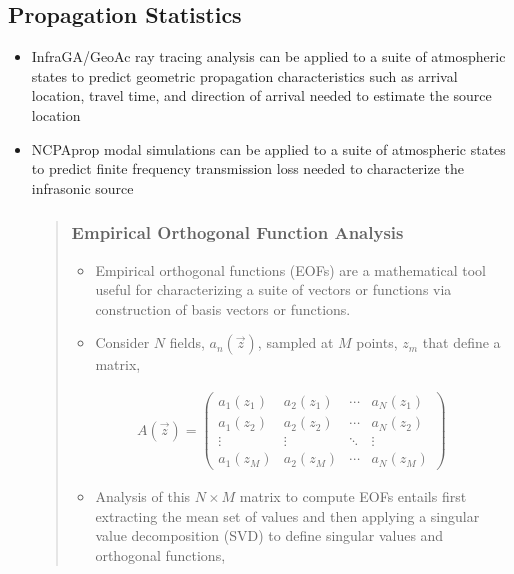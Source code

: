 \documentclass[letterpaper,10pt,english]{sphinxmanual}
\begin{document}
\subsection{Propagation Statistics}
\label{\detokenize{analysis:propagation}}\begin{itemize}
\item {} 
InfraGA/GeoAc ray tracing analysis can be applied to a suite of atmospheric states to predict geometric propagation characteristics such as arrival location, travel time, and direction of arrival needed to estimate the source location

\item {} 
NCPAprop modal simulations can be applied to a suite of atmospheric states to predict finite frequency transmission loss needed to characterize the infrasonic source
\begin{quote}


\subsubsection{Empirical Orthogonal Function Analysis}
\label{\detokenize{eofs:empirical-orthogonal-function-analysis}}\label{\detokenize{eofs:eofs}}\label{\detokenize{eofs::doc}}\begin{itemize}
\item {} 
Empirical orthogonal functions (EOFs) are a mathematical tool useful for characterizing a suite of vectors or functions via construction of basis vectors or functions.

\item {} 
Consider \(N\) fields, \(a_n (\vec{z})\), sampled at \(M\) points, \(z_m\) that define a matrix,

\end{itemize}
\begin{equation*}
\begin{split}A \left( \vec{z} \right) =
\begin{pmatrix}
a_1 \left( z_1 \right) & a_2 \left( z_1 \right)     & \cdots        & a_N \left( z_1 \right) \\
a_1 \left( z_2 \right) & a_2 \left( z_2 \right)     & \cdots        & a_N \left( z_2 \right) \\
\vdots                              & \vdots                                        & \ddots        & \vdots         \\
a_1 \left( z_M \right) & a_2 \left( z_M \right)     & \cdots        & a_N \left( z_M \right)
\end{pmatrix}\end{split}
\end{equation*}\begin{itemize}
\item {} 
Analysis of this \(N \times M\) matrix to compute EOFs entails first extracting the mean set of values and then applying a singular value decomposition (SVD) to define singular values and orthogonal functions,


\end{itemize}
\end{quote}
\end{itemize}
\end{document}
